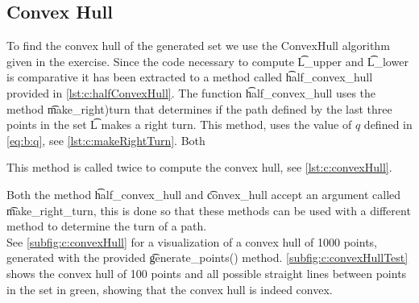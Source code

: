 \subsection*{Convex Hull}
	To find the convex hull of the generated set we use the ConvexHull algorithm given in the exercise. Since the code necessary to compute \t{L\_upper} and \t{L\_lower} is comparative it has been extracted to a method called \t{half\_convex\_hull} provided in \autoref{lst:c:halfConvexHull}. The function \t{half\_convex\_hull} uses the method \t{make_right)turn} that determines if the path defined by the last three points in the set \t{L} makes a right turn. This method, uses the value of $q$ defined in \eqref{eq:b:q}, see \autoref{lst:c:makeRightTurn}. Both 

	This method is called twice to compute the convex hull, see \autoref{lst:c:convexHull}.

	

	

	

	Both the method \t{half_convex_hull} and \t{convex_hull} accept an argument called \t{make_right_turn}, this is done so that these methods can be used with a different method to determine the turn of a path.\\

	See \autoref{subfig:c:convexHull} for a visualization of a convex hull of 1000 points, generated with the provided \t{generate\_points()} method. \autoref{subfig:c:convexHullTest} shows the convex hull of 100 points and all possible straight lines between points in the set in green, showing that the convex hull is indeed convex.

